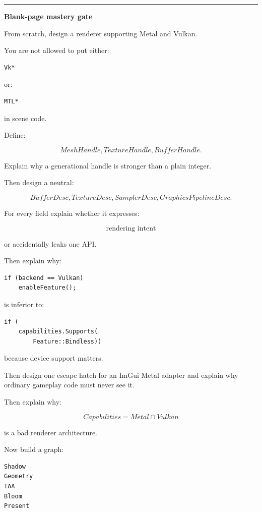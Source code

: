 \begin{center}\rule{0.5\linewidth}{0.5pt}\end{center}

\textbf{Blank-page mastery gate}

From scratch, design a renderer supporting Metal and Vulkan.

You are not allowed to put either:

\begin{verbatim}
Vk*
\end{verbatim}

or:

\begin{verbatim}
MTL*
\end{verbatim}

in scene code.

Define:

\[
MeshHandle,
TextureHandle,
BufferHandle.
\]

Explain why a generational handle is stronger than a plain integer.

Then design a neutral:

\[
BufferDesc,
TextureDesc,
SamplerDesc,
GraphicsPipelineDesc.
\]

For every field explain whether it expresses:

\[
\text{rendering intent}
\]

or accidentally leaks one API.

Then explain why:

\begin{verbatim}
if (backend == Vulkan)
    enableFeature();
\end{verbatim}

is inferior to:

\begin{verbatim}
if (
    capabilities.Supports(
        Feature::Bindless))
\end{verbatim}

because device support matters.

Then design one escape hatch for an ImGui Metal adapter and explain why ordinary gameplay code must never see it.

Then explain why:

\[
Capabilities=
Metal\cap Vulkan
\]

is a bad renderer architecture.

Now build a graph:

\begin{verbatim}
Shadow
Geometry
TAA
Bloom
Present
\end{verbatim}

